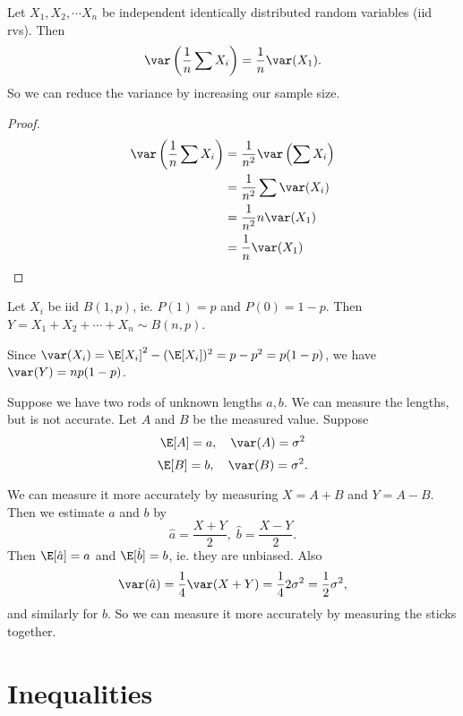 \documentclass[a4paper]{article}
\begin{document}
\begin{cor}
 Let $X_1, X_2, \cdots X_n$ be independent identically distributed random variables (iid rvs). Then
 \[
   \var\left(\frac{1}{n}\sum X_i\right) = \frac{1}{n}\var (X_1).
 \]
 So we can reduce the variance by increasing our sample size.
\end{cor}

\begin{proof}
  \begin{align*}
    \var\left(\frac{1}{n}\sum X_i\right) &= \frac{1}{n^2}\var\left(\sum X_i\right)\\
    &= \frac{1}{n^2}\sum \var(X_i)\\
    &= \frac{1}{n^2} n \var(X_1)\\
    &= \frac{1}{n}\var (X_1)
  \end{align*}
\end{proof}

\begin{eg}
  Let $X_i$ be iid $B(1, p)$, ie. $P(1) = p$ and $P(0) = 1 - p$. Then $Y = X_1 + X_2 + \cdots + X_n \sim B(n, p)$. 
  
  Since $\var(X_i) = \E[X_i]^2 - (\E[X_i])^2 = p - p^2 = p(1 - p)$, we have $\var (Y) = np(1 - p)$.
\end{eg}

\begin{eg}
  Suppose we have two rods of unknown lengths $a, b$. We can measure the lengths, but is not accurate. Let $A$ and $B$ be the measured value. Suppose
  \[
    \E[A] = a,\quad \var(A) = \sigma^2
  \]
  \[
    \E[B] = b, \quad \var(B) = \sigma^2.
  \]

  We can measure it more accurately by measuring $X = A + B$ and $Y = A - B$. Then we estimate $a$ and $b$ by
  \[
    \hat{a} = \frac{X + Y}{2},\; \hat{b} = \frac{X - Y}{2}.
  \]
  Then $\E[\hat{a}] = a$ and $\E[\hat{b}] = b$, ie. they are unbiased. Also
  \[
    \var (\hat{a}) = \frac{1}{4}\var(X + Y) = \frac{1}{4}2\sigma^2 = \frac{1}{2}\sigma^2,
  \]
  and similarly for $b$. So we can measure it more accurately by measuring the sticks together.
\end{eg}

\section{Inequalities}
\end{document}
